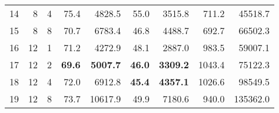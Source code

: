 \begin{table}[!htbp]
\begin{tabular}{rrrrrrrrr}
14  & 8          & 4       & 75.4  & 4828.5  & 55.0  & 3515.8 & 711.2  & 45518.7 \\
15  & 8          & 8       & 70.7  & 6783.4  & 46.8  & 4488.7 & 692.7  & 66502.3 \\ \hline
16  & 12         & 1       & 71.2  & 4272.9  & 48.1  & 2887.0 & 983.5  & 59007.1 \\
17  & 12         & 2       & \textbf{69.6}  & \textbf{5007.7}  & \textbf{46.0}  & \textbf{3309.2} & 1043.4 & 75122.3 \\
18  & 12         & 4       & 72.0  & 6912.8  & \textbf{45.4}  & \textbf{4357.1} & 1026.6 & 98549.5 \\
19  & 12         & 8       & 73.7  & 10617.9 & 49.9  & 7180.6 & 940.0  & 135362.0
\end{tabular}
\end{table}
